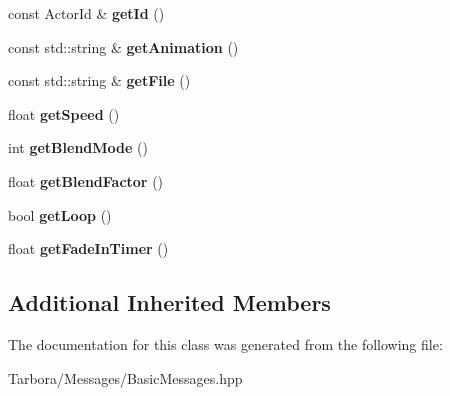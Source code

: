\begin{DoxyCompactItemize}
const Actor\+Id \& {\bfseries get\+Id} ()
\item 
\mbox{\label{classTarbora_1_1Message_1_1StartAnimation_a8ea6fe4523bcc929496a525d88497d11}} 
const std\+::string \& {\bfseries get\+Animation} ()
\item 
\mbox{\label{classTarbora_1_1Message_1_1StartAnimation_a47c9cbbda44d34b4299e0cc807e1adef}} 
const std\+::string \& {\bfseries get\+File} ()
\item 
\mbox{\label{classTarbora_1_1Message_1_1StartAnimation_a10199de2ce9ce4856b79e49eddaf7809}} 
float {\bfseries get\+Speed} ()
\item 
\mbox{\label{classTarbora_1_1Message_1_1StartAnimation_aaaa8be18c0ad56b77f03ac7c955b1d90}} 
int {\bfseries get\+Blend\+Mode} ()
\item 
\mbox{\label{classTarbora_1_1Message_1_1StartAnimation_a6ad2d93b2fe940c5976f01e3cc2e49a7}} 
float {\bfseries get\+Blend\+Factor} ()
\item 
\mbox{\label{classTarbora_1_1Message_1_1StartAnimation_a56d60be520520910453de754e6fa3fce}} 
bool {\bfseries get\+Loop} ()
\item 
\mbox{\label{classTarbora_1_1Message_1_1StartAnimation_ad2acf936e6873242e78441d8bb01d22f}} 
float {\bfseries get\+Fade\+In\+Timer} ()
\end{DoxyCompactItemize}
\subsection*{Additional Inherited Members}


The documentation for this class was generated from the following file\+:\begin{DoxyCompactItemize}
\item 
Tarbora/\+Messages/Basic\+Messages.\+hpp\end{DoxyCompactItemize}
